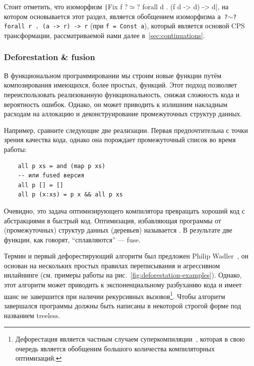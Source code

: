 Стоит отметить, что изоморфизм \texttt|Fix f ?$\simeq$? forall d . (f d -> d) -> d|, на котором основывается этот раздел, является обобщением изоморфизма \texttt{a ?$\sim$? forall r . (a -> r) -> r} (при \texttt{f = Const a}), который является основой CPS трансформации, рассматриваемой нами далее в~\ref{sec:continuations}.

\subsubsection{Deforestation \& fusion} \label{subsubsec:deforestation-fusion}

В функциональном программировании мы строим новые функции путём композирования имеющихся, более простых, функций.
Этот подход позволяет переиспользовать реализованную функциональность, снижая сложность кода и вероятность ошибок.
Однако, он может приводить к излишним накладным расходам на аллокацию и деконструирование промежуточных структур данных.

Например, сравните следующие две реализации.
Первая предпочтительна с точки зрения качества кода, однако она порождает промежуточный список во время работы:
\begin{verbatim}
    all p xs = and (map p xs)
    -- или fused версия
    all p [] = []
    all p (x:xs) = p x && all p xs
\end{verbatim}

Очевидно, это задача оптимизирующего компилятора превращать хороший код с абстракциями в быстрый код.
Оптимизация, избавляющая программы от (промежуточных) структур данных (деревьев) называется .
В результате две функции, как говорят, ``сплавляются'' --- fuse.

Термин и первый дефорестирующий алгоритм был предложен Philip Wadler~\cite{wadler1988deforestation}, он основан на нескольких простых правилах переписывания и агрессивном инлайнинге (см. примеры работы на рис.~\ref{fig:deforestation-examples}).
Однако, этот алгоритм может приводить к экспоненциальному разбуханию кода и имеет шанс не завершится при наличии рекурсивных вызовов\footnote{Дефорестация является частным случаем суперкомпиляции~\cite{supercomp}, которая в свою очередь является обобщеним большого количества компиляторных оптимизаций.}.
Чтобы алгоритм завершался программы должны быть написаны в некоторой строгой форме под названием treeless.

